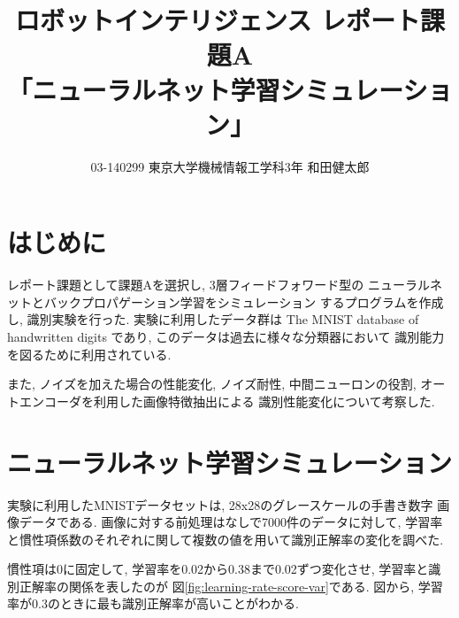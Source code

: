 \documentclass[10pt]{jarticle}
\title{ロボットインテリジェンス レポート課題A \\
      「ニューラルネット学習シミュレーション」}
\author{03-140299 東京大学機械情報工学科3年 和田健太郎}
\begin{document}
\maketitle

\section{はじめに}
レポート課題として課題Aを選択し, 3層フィードフォワード型の
ニューラルネットとバックプロパゲーション学習をシミュレーション
するプログラムを作成し, 識別実験を行った. 
実験に利用したデータ群は
The MNIST database of handwritten digits
であり, このデータは過去に様々な分類器において
識別能力を図るために利用されている. \cite{mnist}

また, ノイズを加えた場合の性能変化, ノイズ耐性, 
中間ニューロンの役割, オートエンコーダを利用した画像特徴抽出による
識別性能変化について考察した. 

\section{ニューラルネット学習シミュレーション}
実験に利用したMNISTデータセットは, 28x28のグレースケールの手書き数字
画像データである. 画像に対する前処理はなしで7000件のデータに対して,
学習率と慣性項係数のそれぞれに関して複数の値を用いて識別正解率の変化を調べた. 

慣性項は0に固定して, 学習率を0.02から0.38まで0.02ずつ変化させ,
学習率と識別正解率の関係を表したのが
図\ref{fig:learning-rate-score-var}である. 
図から, 学習率が0.3のときに最も識別正解率が高いことがわかる. 
\end{document}
